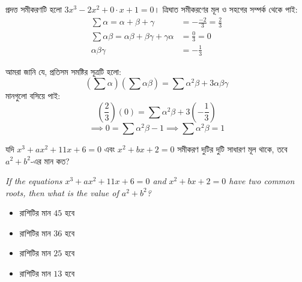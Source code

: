 \documentclass[12pt, a4paper]{article}
\begin{document}
\begin{tcolorbox}[solutionbox={সমাধান (Solution)}]
    \noindent
    প্রদত্ত সমীকরণটি হলো $3x^3 - 2x^2 + 0 \cdot x + 1 = 0$। ত্রিঘাত সমীকরণের মূল ও সহগের সম্পর্ক থেকে পাই:
    \begin{align*}
        \sum \alpha = \alpha+\beta+\gamma &= -\frac{-2}{3} = \frac{2}{3} \\
        \sum \alpha\beta = \alpha\beta+\beta\gamma+\gamma\alpha &= \frac{0}{3} = 0 \\
        \alpha\beta\gamma &= -\frac{1}{3}
    \end{align*}
    
    \vspace{0.5em}
    আমরা জানি যে, প্রতিসম সমষ্টির সূত্রটি হলো:
    \[ (\sum \alpha)(\sum \alpha\beta) = \sum \alpha^2\beta + 3\alpha\beta\gamma \]
    মানগুলো বসিয়ে পাই:
    \[ \left(\frac{2}{3}\right)(0) = \sum \alpha^2\beta + 3\left(-\frac{1}{3}\right) \]
    \[ \implies 0 = \sum \alpha^2\beta - 1 \implies \sum \alpha^2\beta = 1 \]
\end{tcolorbox}
\begin{tcolorbox}[questionbox={প্রশ্ন (Question) 35}]
    \noindent
    যদি $x^3 + ax^2 + 11x + 6 = 0$ এবং $x^2 + bx + 2 = 0$ সমীকরণ দুটির দুটি সাধারণ মূল থাকে, তবে $a^2 + b^2$-এর মান কত?
    
    \vspace{0.8em}
    \begin{english}
    \noindent\textit{\color{darkgray}
    If the equations $x^3 + ax^2 + 11x + 6 = 0$ and $x^2 + bx + 2 = 0$ have two common roots, then what is the value of $a^2 + b^2$?
    }
    \end{english}
\end{tcolorbox}

\begin{itemize}[label={}, leftmargin=1cm, itemsep=0.5em]
    \item[\textbf{A)}] রাশিটির মান $45$ হবে
    \item[\textbf{B)}] রাশিটির মান $36$ হবে
    \item[\textbf{C)}] রাশিটির মান $25$ হবে
    \item[\textbf{D)}] রাশিটির মান $13$ হবে
\end{itemize}
\end{document}
